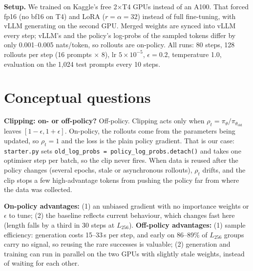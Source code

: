 \documentclass[10.5pt]{article}
\newcommand{\code}[1]{\texttt{#1}}
\begin{document}
\textbf{Setup.} We trained on Kaggle's free 2$\times$T4 GPUs instead of an A100. That forced fp16 (no bf16 on T4) and
LoRA ($r=\alpha=32$) instead of full fine-tuning, with vLLM generating on the second GPU. Merged weights are synced into
vLLM every step; vLLM's and the policy's log-probs of the sampled tokens differ by only 0.001--0.005 nats/token, so
rollouts are on-policy. All runs: 80 steps, 128 rollouts per step (16 prompts $\times$ 8), lr $5\times10^{-5}$,
$\epsilon=0.2$, temperature 1.0, evaluation on the 1,024 test prompts every 10 steps.

\section{Conceptual questions}
\textbf{Clipping: on- or off-policy?} Off-policy. Clipping acts only when $\rho_t=\pi_\theta/\pi_{\theta_\text{old}}$ leaves
$[1-\epsilon,1+\epsilon]$. On-policy, the rollouts come from the parameters being updated, so $\rho_t=1$ and the loss is the
plain policy gradient. That is our case: \code{starter.py} sets \code{old\_log\_probs = policy\_log\_probs.detach()} and
takes one optimiser step per batch, so the clip never fires. When data is reused after the policy changes (several
epochs, stale or asynchronous rollouts), $\rho_t$ drifts, and the clip stops a few high-advantage tokens from pushing the
policy far from where the data was collected.

\textbf{On-policy advantages:} (1) an unbiased gradient with no importance weights or $\epsilon$ to tune; (2) the baseline
reflects current behaviour, which changes fast here (length falls by a third in 30 steps at $L_{256}$).
\textbf{Off-policy advantages:} (1) sample efficiency: generation costs 15--33\,s per step, and early on 86--89\% of
$L_{256}$ groups carry no signal, so reusing the rare successes is valuable; (2) generation and training can run in
parallel on the two GPUs with slightly stale weights, instead of waiting for each other.
\end{document}
